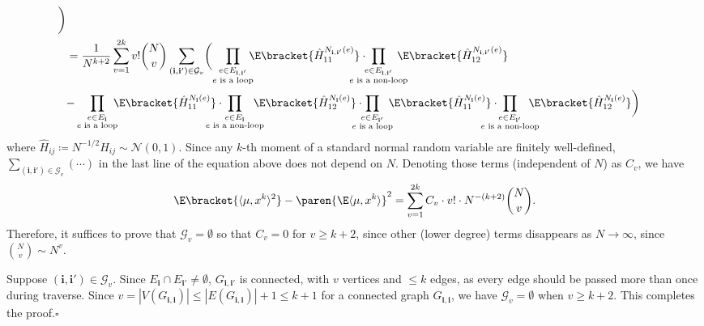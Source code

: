 \documentclass{homework}
\begin{document}
{\begin{align*}
        \biggr)
    \\ &= \frac 1 {N^{k + 2}} \sum_{v=1}^{2k} v!\binom N v \sum_{(\mathbf i,\mathbf i') \in \mathcal G_v} \biggl(
        \prod_{\substack{e\in E_{\mathbf i,\mathbf i'} \\ \text{$e$ is a loop}}}\mkern-10mu \E\bracket{ \hat H_{11}^{N_{\mathbf i,\mathbf i'} (e)} }\cdot \mkern-30mu\prod_{\substack{e\in E_{\mathbf i,\mathbf i'} \\ \text{$e$ is a non-loop}}} \mkern-20mu\E\bracket{ \hat H_{12}^{N_{\mathbf i,\mathbf i'} (e)} } \biggr.
        \\&\biggl. - 
        \prod_{\substack{e\in E_{\mathbf i} \\ \text{$e$ is a loop}}} \mkern-10mu\E\bracket{ \hat H_{11}^{N_{\mathbf i} (e)} }\cdot \mkern-30mu\prod_{\substack{e\in E_{\mathbf i} \\ \text{$e$ is a non-loop}}} \mkern-20mu\E\bracket{ \hat H_{12}^{N_{\mathbf i} (e)} }\cdot \mkern-20mu
        \prod_{\substack{e\in E_{\mathbf i'} \\ \text{$e$ is a loop}}}\mkern-10mu \E\bracket{ \hat H_{11}^{N_{\mathbf i} (e)} }\cdot \mkern-30mu\prod_{\substack{e\in E_{\mathbf i'} \\ \text{$e$ is a non-loop}}} \mkern-20mu\E\bracket{ \hat H_{12}^{N_{\mathbf i} (e)} }
        \biggr)
\end{align*}
where $\hat H_{ij} \coloneqq N^{-1/2}H_{ij}\sim \mathcal N(0,1)$. Since any $k$-th moment of a standard normal random variable are finitely well-defined, $\sum_{(\mathbf i,\mathbf i')\in \mathcal G_v} (\cdots)$ in the last line of the equation above does not depend on $N$. Denoting those terms (independent of $N$) as $C_v$, we have
$$ \E\bracket{\langle{\mu, x^k}\rangle^2} - \paren{\E\langle{\mu,x^k}\rangle}^2 = \sum_{v=1}^{2k} C_v\cdot v!\cdot N^{-(k+2)}\binom N v. $$
Therefore, it suffices to prove that $\mathcal G_v = \emptyset$ so that $C_v = 0$ for $v\ge k+2$, since other (lower degree) terms disappears as $N\to \infty$, since $\binom N v \sim N^{v}$.

Suppose $(\mathbf i, \mathbf i') \in \mathcal G_v$. Since $E_{\mathbf i} \cap E_{\mathbf i'}\ne\emptyset$, $G_{\mathbf i,\mathbf i'}$ is connected, with $v$ vertices and $\le k$ edges, as every edge should be passed more than once during traverse. Since $v = |V(G_{\mathbf i,\mathbf i})| \le |E(G_{\mathbf i,\mathbf i})| + 1 \le k+1$ for a connected graph $G_{\mathbf i,\mathbf i}$, we have $\mathcal G_v = \emptyset$ when $v \ge k+2$. This completes the proof.\hfill $\square$
}
\end{document}
